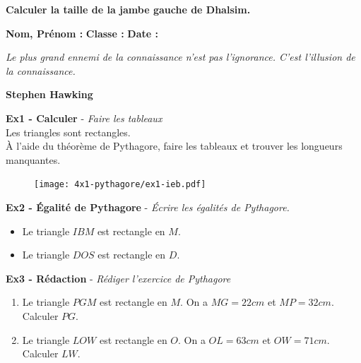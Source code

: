 \textbf{Calculer la taille de la jambe gauche de Dhalsim.} 

\newpage

\textbf{Nom, Prénom :} \hspace{8cm} \textbf{Classe :} \hspace{3cm} \textbf{Date :}\\

\begin{center}
  \textit{Le plus grand ennemi de la connaissance n'est pas l'ignorance. C'est l'illusion de la connaissance.} 
  
  \textbf{Stephen Hawking}
\end{center}

\begin{multicols}{2}

\textbf{Ex1 - Calculer} - \textit{Faire les tableaux}\\

Les triangles sont rectangles. \\ 

À l'aide du théorème de Pythagore, faire les tableaux et trouver les longueurs manquantes. \columnbreak

\begin{figure}[H]
  \centering
  \texttt{[image: 4x1-pythagore/ex1-ieb.pdf]}
\end{figure} 

\end{multicols} 

\textbf{Ex2 - Égalité de Pythagore} - \textit{Écrire les égalités de Pythagore.}\\

\begin{itemize}
  \item[1.] Le triangle $IBM$ est rectangle en $M$. 
  \item[2.] Le triangle $DOS$ est rectangle en $D$. \\
\end{itemize}

\textbf{Ex3 - Rédaction} - \textit{Rédiger l'exercice de Pythagore}\\

\begin{enumerate}
  \item[1.] Le triangle $PGM$ est rectangle en $M$. On a $MG = 22cm$ et $MP = 32cm$. Calculer $PG$. 
  \item[2.] Le triangle $LOW$ est rectangle en $O$. On a $OL = 63cm$ et $OW = 71cm$. Calculer $LW$. \\
\end{enumerate} 

